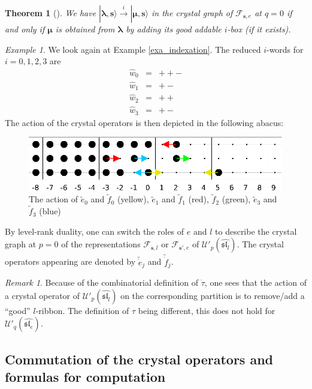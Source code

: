 \documentclass[twoside,12pt]{amsart}
\theoremstyle{plain}
\newcommand{\cF}{\mathcal{F}}
\newcommand{\bs}{\mathbf{s}}
\newcommand{\la}{\lambda}
\newcommand{\bla}{\boldsymbol{\la}}
\newcommand{\bmu}{\boldsymbol{\mu}}
\newcommand{\te}{\tilde{e}}
\newcommand{\tf}{\tilde{f}}
\newcommand{\dtau}{\dot{\tau}}
\newcommand{\dbs}{\dot{\bs}}
\newcommand{\tde}{\tilde{\dot{e}}}
\newcommand{\tdf}{\tilde{\dot{f}}}
\newcommand{\hw}{\widehat{w}}
\newcommand{\lra}{\longrightarrow}
\newcommand{\Ue}{\mathcal{U}'_q (\widehat{\mathfrak{sl}_e})}
\newcommand{\Ul}{\mathcal{U}'_p (\widehat{\mathfrak{sl}_l})}
\newtheorem{thm}[num]{Theorem}
\theoremstyle{remark}
\newtheorem{exa}[num]{Example}
\newtheorem{rem}[num]{Remark}
\begin{document}
\begin{thm}[\mbox{\cite[Theorem 3.8]{JMMO1991}}]\label{thm_crystal_graph}
We have $|\bla,\bs\rangle \overset{i}{\lra}|\bmu,\bs\rangle$ in the crystal graph of $\cF_{\bs,e}$ at $q=0$
if and only if $\bmu$ is obtained from $\bla$
by adding its good addable $i$-box (if it exists).
\end{thm}

\begin{exa}\label{exa_crystal_op}
We look again at Example \ref{exa_indexation}.
The reduced $i$-words for $i=0,1,2,3$ are
\begin{equation*}\label{iwords}
\begin{array}{ccl}
\hw_0 & = & ++- \\
\hw_1 & = & +- \\
\hw_2 & = & ++ \\
\hw_3 & = & +-
\end{array}
\end{equation*}
The action of the crystal operators is then depicted
in the following abacus:
\begin{figure}[H] 
\includegraphics{images/abaque14.eps}
\caption{The action of $\te_0$ and $\tf_0$ (yellow),
$\te_1$ and $\tf_1$ (red),
$\tf_2$ (green),
$\te_3$ and $\tf_3$ (blue)
}
\label{ab14}
\end{figure}

\end{exa}

By level-rank duality, one can switch the roles of $e$ and $l$
to describe the crystal graph at $p=0$ of the representations
$\cF_{\dbs,l}$ or $\cF_{\dbs',e}$ of $\Ul$.
The crystal operators appearing are denoted by ${\tde_j}$ and ${\tdf_j}$.


\begin{rem}
Because of the combinatorial definition of $\dtau$, one sees that the action of a crystal operator of $\Ul$
on the corresponding partition is to remove/add a ``good'' $l$-ribbon.
The definition of $\tau$ being different, this does not hold for $\Ue$.
\end{rem}


\subsection{Commutation of the crystal operators and formulas for computation}\label{comm_crystals}\
\end{document}

